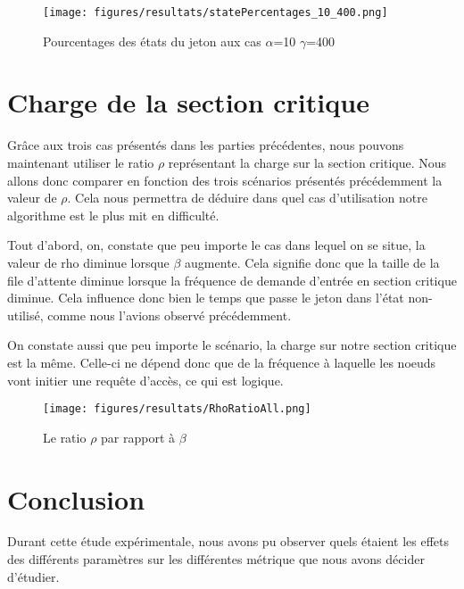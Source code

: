 \documentclass[12pt,a4paper]{article}
\begin{document}
\begin{figure}[h!]
    \centering
    \texttt{[image: figures/resultats/statePercentages\_10\_400.png]}
    \caption{Pourcentages des états du jeton aux cas $\alpha$=10 $\gamma$=400}
    \label{fig:statePercentages-10-400}
\end{figure}

\pagebreak

\section{Charge de la section critique}

Grâce aux trois cas présentés dans les parties précédentes, nous pouvons maintenant utiliser le ratio $\rho$ représentant la charge sur la section critique. 
Nous allons donc comparer en fonction des trois scénarios présentés précédemment la valeur de $\rho$. Cela nous permettra de déduire dans quel cas d'utilisation notre algorithme est le plus mit en difficulté.

Tout d'abord, on, constate que peu importe le cas dans lequel on se situe, la valeur de rho diminue lorsque $\beta$ augmente. Cela signifie donc que la taille de la file d'attente diminue lorsque la fréquence de demande d'entrée en section critique diminue. Cela influence donc bien le temps que passe le jeton dans l'état non-utilisé, comme nous l'avions observé précédemment.

On constate aussi que peu importe le scénario, la charge sur notre section critique est la même. Celle-ci ne dépend donc que de la fréquence à laquelle les noeuds vont initier une requête d'accès, ce qui est logique.


\begin{figure}[h!]
    \centering
    \texttt{[image: figures/resultats/RhoRatioAll.png]}
    \caption{Le ratio $\rho$ par rapport à $\beta$}
    \label{fig:rhoRatio}
\end{figure}

\pagebreak

\section{Conclusion}

Durant cette étude expérimentale, nous avons pu observer quels étaient les effets des différents paramètres sur les différentes métrique que nous avons décider d'étudier.
\end{document}
